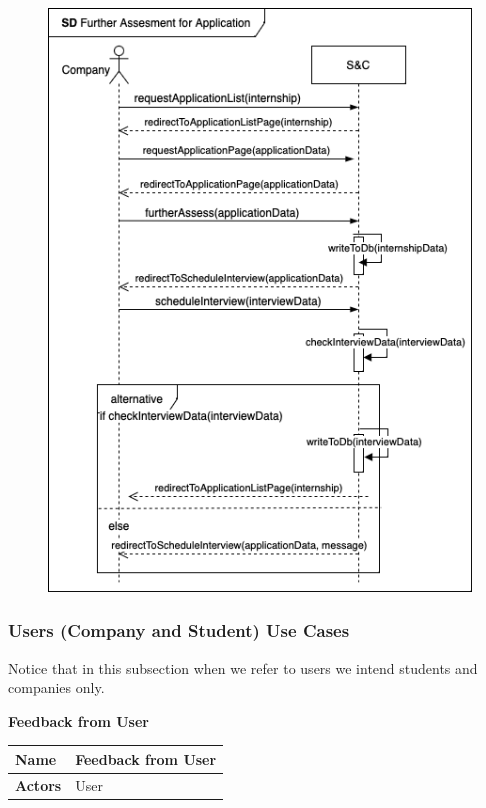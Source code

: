 \begin{enumerate}[label=\textbf{[US\arabic*]}, left = 0pt, align = left, resume]
\newpage
            \begin{figure}[h!]
                \centering        \includegraphics{RASD/Images/UseCases/FurtherAssessment.drawio.png}
                \label{fig:example}
                \end{figure}
\newpage


\newpage
    \subsubsection{Users (Company and Student) Use Cases}
    Notice that in this subsection when we refer to users we intend students and companies only.
\item \textbf{Feedback from User}
            
            \begin{longtable}{|l|p{11cm}|}  
                \hline
                \textbf{Name} & 
                    \textbf{Feedback from User} \\
                \hline
                
                \textbf{Actors} & 
                    User\\
                \hline
                

\end{longtable}
\end{enumerate}
